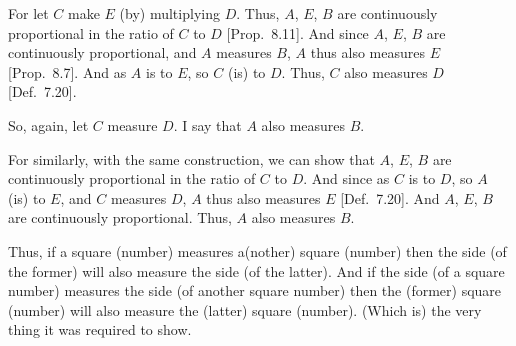 \begin{Parallel}{}{}
{\epsfysize=1in
\centerline{}

For let $C$ make $E$ (by) multiplying $D$. Thus, $A$, $E$, $B$
are continuously proportional in the ratio of $C$ to $D$
[Prop.~8.11]. And since $A$, $E$, $B$ are
continuously proportional, and $A$ measures $B$, $A$ thus also
measures $E$ [Prop.~8.7]. And as $A$ is to $E$,
so $C$ (is) to $D$. Thus, $C$ also measures $D$ [Def.~7.20].

So, again, let $C$ measure $D$. I say that $A$ also measures $B$.

For similarly, with the same construction, we can show that $A$, $E$, $B$
are continuously proportional in the ratio of $C$ to $D$. And since as $C$
is to $D$, so $A$ (is) to $E$, and $C$ measures $D$, $A$ thus
also measures $E$ [Def.~7.20]. And $A$, $E$,
$B$ are continuously proportional. Thus, $A$ also measures $B$.

Thus, if a square (number) measures a(nother) square
(number) then the side (of the former) will also measure the
side (of the latter). And if the side (of a square number) measures the side
(of another square number) then the (former) square (number) will also
measure the (latter) square (number). (Which is) the very thing it was
required to show.}
\end{Parallel}

